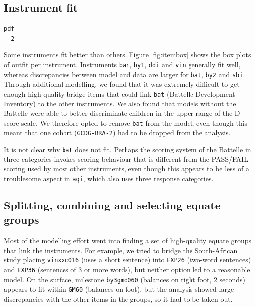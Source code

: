 \documentclass[
]{book}
\begin{document}
\hypertarget{instrument-fit}{%
\subsection{Instrument fit}\label{instrument-fit}}

\begin{verbatim}
pdf 
  2 
\end{verbatim}



Some instruments fit better than others. Figure \ref{fig:itembox} shows the box plots of outfit per instrument. Instruments \texttt{bar}, \texttt{by1}, \texttt{ddi} and \texttt{vin} generally fit well, whereas discrepancies between model and data are larger for \texttt{bat}, \texttt{by2} and \texttt{sbi}. Through additional modelling, we found that it was extremely difficult to get enough high-quality bridge items that could link \texttt{bat} (Battelle Development Inventory) to the other instruments. We also found that models without the Battelle were able to better discriminate children in the upper range of the D-score scale. We therefore opted to remove \texttt{bat} from the model, even though this meant that one cohort (\texttt{GCDG-BRA-2}) had to be dropped from the analysis.

It is not clear why \texttt{bat} does not fit. Perhaps the scoring system of the Battelle in three categories invokes scoring behaviour that is different from the PASS/FAIL scoring used by most other instruments, even though this appears to be less of a troublesome aspect in \texttt{aqi}, which also uses three response categories.

\hypertarget{splitting-combining-and-selecting-equate-groups}{%
\subsection{Splitting, combining and selecting equate groups}\label{splitting-combining-and-selecting-equate-groups}}

Most of the modelling effort went into finding a set of high-quality equate groups that link the instruments. For example, we tried to bridge the South-African study placing \texttt{vinxxc016} (uses a short sentence) into \texttt{EXP26} (two-word sentences) and \texttt{EXP36} (sentences of 3 or more words), but neither option led to a reasonable model. On the surface, milestone \texttt{by3gmd060} (balances on right foot, 2 seconds) appears to fit within \texttt{GM60} (balances on foot), but the analysis showed large discrepancies with the other items in the groups, so it had to be taken out.
\end{document}
